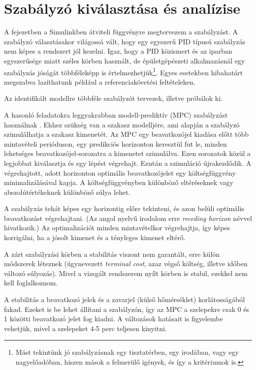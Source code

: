 \chapter{Szabályzó kiválasztása és analízise}\label{chap:control}

A fejezetben a Simulinkben átviteli függvényre megtervezem a szabályzást. A szabályzó választásakor világossá vált, hogy egy egyszerű PID típusú szabályzás nem képes a rendszert jól kezelni. Igaz, hogy a PID közismert és az iparban egyszerűsége miatt széles körben használt, de épületgépészeti alkalmazásnál egy szabályzás jóságát többféleképp is értelmezhetjük\footnote{Mást tekintünk jó szabályzásnak egy tisztatérben, egy irodában, vagy egy nagyelőadóban, hiszen mások a felmerülő igények, és így a kritériumok is.}. Egyes esetekben hibahatárt megszabva lazíthatunk például a referenciakövetési feltételeken.

Az identifikált modellre többféle szabályzót tervezek, illetve próbálok ki.

A hasonló feladatokra leggyakrabban modell-prediktív (MPC) szabályzást használnak \cite{AFRAM2014343}. Ehhez szükség van a szakasz modelljére, ami alapján a szabályzó szimulálhatja a szakasz kimenetét. Az MPC egy beavatkozójel kiadása előtt több mintavételi perióduson, egy predikciós horizonton keresztül fut le, minden lehetséges  beavatkozójel-sorozatra a kimenetet szimulálva.
Ezen sorozatok közül a legjobbat kiválasztja és egy lépést végrehajt. Ezután a szimuláció újrakezdődik. A végrehajtott, adott horizonton optimális beavatkozójelet egy költségfüggvény minimalizálásával kapja. A költségfüggvényben különböző eltéréseknek vagy abszolútértékeknek különböző súlya lehet.

A szabályzás tehát képes egy horizontig előre tekinteni, és azon belüli optimális beavatkozást végrehajtani. (Az angol nyelvű irodalom erre \textit{receding horizon} névvel hivatkozik.) Az optimalizációt minden mintavételkor végrehajtja, így képes korrigálni, ha a jósolt kimenet és a tényleges kimenet eltérő.

A zárt szabályzási körben a stabilitás viszont nem garantált, erre külön módszerek léteznek (úgynevezett \textit{terminal cost}, azaz végső költség, illetve időben változó súlyozás). Mivel a vizsgált rendszerem nyílt körben is stabil, ezekkel nem kell foglalkoznom.

A stabilitás a beavatkozó jelek és a zavarjel (külső hőmérséklet) korlátosságából fakad. Ezeket is be lehet állítani a szabályzón, így az MPC a szelepekre csak 0 és 1 közötti beavatkozó jelet fog kiadni. A változások hatásait is figyelembe vehetjük, mivel a szelepeket 4-5 perc teljesen kinyitni.

